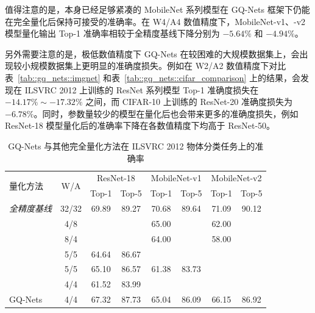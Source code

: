 \documentclass[
  fontset = mac,
]{shtthesis}
\begin{document}
值得注意的是，本身已经足够紧凑的 MobileNet 系列模型在 GQ-Nets 框架下仍能在完全量化后保持可接受的准确率。在 W4/A4 数值精度下，MobileNet-v1、-v2 模型量化输出 Top-1 准确率相较于全精度基线下降分别为 $-5.64\%$ 和 $-4.94\%$。

另外需要注意的是，极低数值精度下 GQ-Nets 在较困难的大规模数据集上，会出现较小规模数据集上更明显的准确度损失。例如在 W2/A2 数值精度下对比表~\ref{tab::gq_nets::imgnet} 和表~\ref{tab::gq_nets::cifar_comparison} 上的结果，会发现在 ILSVRC 2012 上训练的 ResNet 系列模型 Top-1 准确度损失在 $-14.17\% \sim -17.32\%$ 之间，而 CIFAR-10 上训练的 ResNet-20 准确度损失为 $-6.78\%$。同时，参数量较少的模型在量化后也会带来更多的准确度损失，例如 ResNet-18 模型量化后的准确率下降在各数值精度下均高于 ResNet-50。

\begin{table}[htb]
  \caption{GQ-Nets 与其他完全量化方法在 ILSVRC 2012 物体分类任务上的准确率}
  \label{tab::gq_nets::imgnet_comparison}
  \begin{center}
    \begin{tabular}{l *{7}{c}}
      \toprule
      \multirow{2}{*}{量化方法} & \multirow{2}{*}{W/A} & \multicolumn{2}{c}{ResNet-18} & \multicolumn{2}{c}{MobileNet-v1} & \multicolumn{2}{c}{MobileNet-v2} \\
      & & Top-1 & Top-5 & Top-1 & Top-5 & Top-1 & Top-5 \\
      \midrule
      \emph{全精度基线} & 32/32 & 69.89 & 89.27 & 70.68 & 89.64 & 71.09 & 90.12 \\
      \hdashline
      \multirow{2}{*}{\citet{krishnamoorthi2018quantizing}} & 4/8 & & & 65.00 & & 62.00 & \\
        & 8/4 & & & 64.00 & & 58.00 & \\
      \hdashline
      \citet{jacob2018quantization} & 5/5 & 64.64 & 86.67 & & & & \\
      \hdashline
      \multirow{2}{*}{\citet{louizos2018relaxed}} & 5/5 & 65.10 & 86.57 & 61.38 & 83.73 & & \\
        & 4/4 & 61.52 & 83.99 & & & & \\
      \hdashline
        GQ-Nets & 4/4 & 67.32 & 87.73 & 65.04 & 86.09 & 66.15 & 86.92 \\
      \bottomrule
    \end{tabular}
  \end{center}
\end{table}
\end{document}

